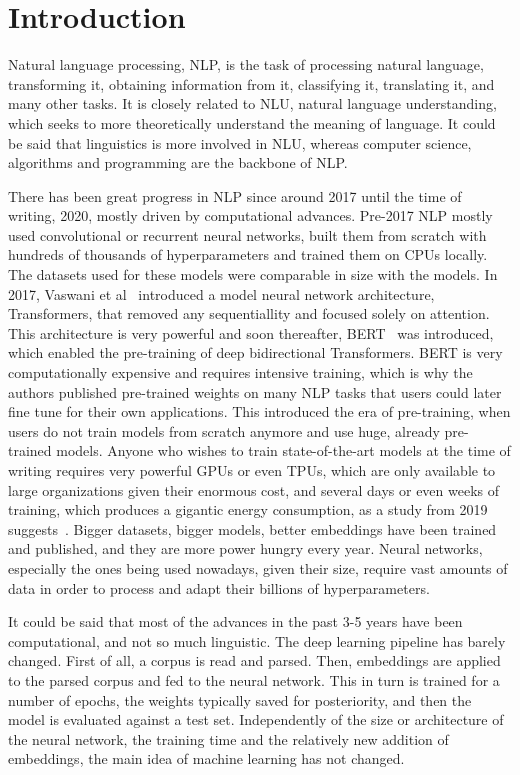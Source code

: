 %
%

\chapter{Introduction}\label{sec:introduction}

Natural language processing, NLP, is the task of processing natural language, transforming it, obtaining information from it, classifying it, translating it, and many other tasks. It is closely related to NLU, natural language understanding, which seeks to more theoretically understand the meaning of language. It could be said that linguistics is more involved in NLU, whereas computer science, algorithms and programming are the backbone of NLP.

There has been great progress in NLP since around 2017 until the time of writing, 2020, mostly driven by computational advances. Pre-2017 NLP mostly used convolutional or recurrent neural networks, built them from scratch with hundreds of thousands of hyperparameters and trained them on CPUs locally. The datasets used for these models were comparable in size with the models. In 2017, Vaswani et al~\cite{vaswani2017attention} introduced a model neural network architecture, Transformers, that removed any sequentiallity and focused solely on attention. This architecture is very powerful and soon thereafter, BERT~\cite{devlin2018bert} was introduced, which enabled the pre-training of deep bidirectional Transformers. BERT is very computationally expensive and requires intensive training, which is why the authors published pre-trained weights on many NLP tasks that users could later fine tune for their own applications. This introduced the era of pre-training, when users do not train models from scratch anymore and use huge, already pre-trained models. Anyone who wishes to train state-of-the-art models at the time of writing requires very powerful GPUs or even TPUs, which are only available to large organizations given their enormous cost, and several days or even weeks of training, which produces a gigantic energy consumption, as a study from 2019 suggests~\cite{strubell2019energy}. Bigger datasets, bigger models, better embeddings have been trained and published, and they are more power hungry every year. Neural networks, especially the ones being used nowadays, given their size, require vast amounts of data in order to process and adapt their billions of hyperparameters.

It could be said that most of the advances in the past 3-5 years have been computational, and not so much linguistic. The deep learning pipeline has barely changed. First of all, a corpus is read and parsed. Then, embeddings are applied to the parsed corpus and fed to the neural network. This in turn is trained for a number of epochs, the weights typically saved for posteriority, and then the model is evaluated against a test set. Independently of the size or architecture of the neural network, the training time and the relatively new addition of embeddings, the main idea of machine learning has not changed.

